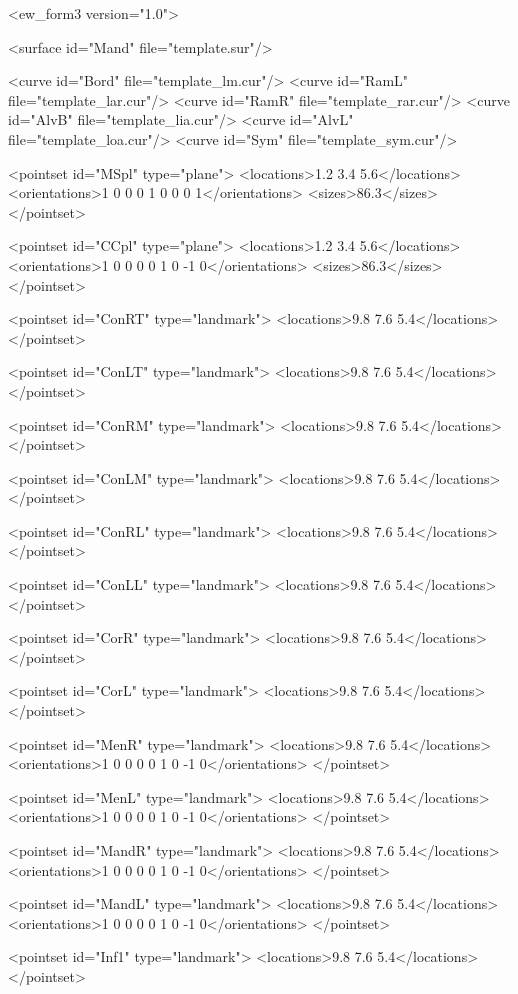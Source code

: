 
\begin{DoxyVerbInclude}
<ew_form3 version="1.0">

<surface id="Mand" file="template.sur"/>

<curve id="Bord" file="template_lm.cur"/>
<curve id="RamL" file="template_lar.cur"/>
<curve id="RamR" file="template_rar.cur"/>
<curve id="AlvB" file="template_lia.cur"/>
<curve id="AlvL" file="template_loa.cur"/>
<curve id="Sym" file="template_sym.cur"/>

<pointset id="MSpl" type="plane">
<locations>1.2 3.4 5.6</locations>
<orientations>1 0 0 0 1 0 0 0 1</orientations>
<sizes>86.3</sizes>
</pointset>

<pointset id="CCpl" type="plane">
<locations>1.2 3.4 5.6</locations>
<orientations>1 0 0 0 0 1 0 -1 0</orientations>
<sizes>86.3</sizes>
</pointset>

<pointset id="ConRT" type="landmark">
<locations>9.8 7.6 5.4</locations>
</pointset>

<pointset id="ConLT" type="landmark">
<locations>9.8 7.6 5.4</locations>
</pointset>

<pointset id="ConRM" type="landmark">
<locations>9.8 7.6 5.4</locations>
</pointset>

<pointset id="ConLM" type="landmark">
<locations>9.8 7.6 5.4</locations>
</pointset>

<pointset id="ConRL" type="landmark">
<locations>9.8 7.6 5.4</locations>
</pointset>

<pointset id="ConLL" type="landmark">
<locations>9.8 7.6 5.4</locations>
</pointset>

<pointset id="CorR" type="landmark">
<locations>9.8 7.6 5.4</locations>
</pointset>

<pointset id="CorL" type="landmark">
<locations>9.8 7.6 5.4</locations>
</pointset>

<pointset id="MenR" type="landmark">
<locations>9.8 7.6 5.4</locations>
<orientations>1 0 0 0 0 1 0 -1 0</orientations>
</pointset>

<pointset id="MenL" type="landmark">
<locations>9.8 7.6 5.4</locations>
<orientations>1 0 0 0 0 1 0 -1 0</orientations>
</pointset>

<pointset id="MandR" type="landmark">
<locations>9.8 7.6 5.4</locations>
<orientations>1 0 0 0 0 1 0 -1 0</orientations>
</pointset>

<pointset id="MandL" type="landmark">
<locations>9.8 7.6 5.4</locations>
<orientations>1 0 0 0 0 1 0 -1 0</orientations>
</pointset>

<pointset id="Inf1" type="landmark">
<locations>9.8 7.6 5.4</locations>
</pointset>


\end{DoxyVerbInclude}

